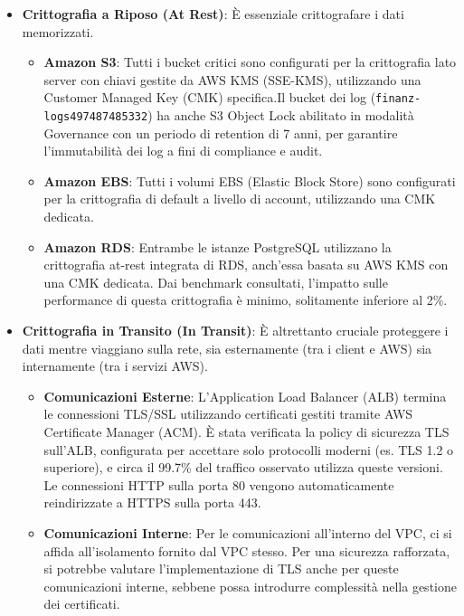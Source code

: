 \begin{itemize}
    \item \textbf{Crittografia a Riposo (At Rest)}: È essenziale crittografare i dati memorizzati.
    \begin{itemize}
        \item \textbf{Amazon S3}: Tutti i bucket critici sono configurati per la crittografia lato server con chiavi gestite da AWS KMS (SSE-KMS), utilizzando una Customer Managed Key (CMK) specifica.Il bucket dei log (\texttt{finanz-logs\discretionary{-}{}{-}497487485332}) ha anche S3 Object Lock abilitato in modalità Governance con un periodo di retention di 7 anni, per garantire l'immutabilità dei log a fini di compliance e audit.
        \item \textbf{Amazon EBS}: Tutti i volumi EBS (Elastic Block Store) sono configurati per la crittografia di default a livello di account, utilizzando una CMK dedicata.
        \item \textbf{Amazon RDS}: Entrambe le istanze PostgreSQL utilizzano la crittografia at-rest integrata di RDS, anch'essa basata su AWS KMS con una CMK dedicata. Dai benchmark consultati, l'impatto sulle performance di questa crittografia è minimo, solitamente inferiore al 2\%.
    \end{itemize}
    \item \textbf{Crittografia in Transito (In Transit)}: È altrettanto cruciale proteggere i dati mentre viaggiano sulla rete, sia esternamente (tra i client e AWS) sia internamente (tra i servizi AWS).
    \begin{itemize}
        \item \textbf{Comunicazioni Esterne}: L'Application Load Balancer (ALB) termina le connessioni TLS/SSL utilizzando certificati gestiti tramite AWS Certificate Manager (ACM). È stata verificata la policy di sicurezza TLS sull'ALB, configurata per accettare solo protocolli moderni (es. TLS 1.2 o superiore), e circa il 99.7\% del traffico osservato utilizza queste versioni. Le connessioni HTTP sulla porta 80 vengono automaticamente reindirizzate a HTTPS sulla porta 443.
        \item \textbf{Comunicazioni Interne}: Per le comunicazioni all'interno del VPC, ci si affida all'isolamento fornito dal VPC stesso. Per una sicurezza rafforzata, si potrebbe valutare l'implementazione di TLS anche per queste comunicazioni interne, sebbene possa introdurre complessità nella gestione dei certificati.
    \end{itemize}
\end{itemize}

